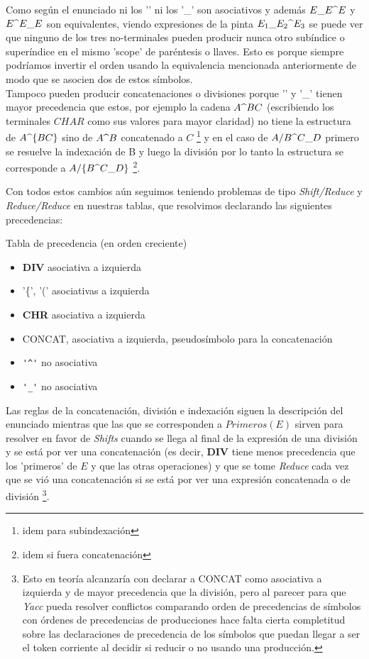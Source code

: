 Como según el enunciado ni los '\super ' ni los '_' son asociativos y además $E\sub  E \super  E$ y $E\super  E \sub  E$ son equivalentes, viendo expresiones de la pinta $E_1 \sub  E_2 \super  E_3$ se puede ver que ninguno de los tres no-terminales pueden producir nunca otro subíndice o superíndice en el mismo 'scope' de paréntesis o llaves. Esto es porque siempre podríamos invertir el orden usando la equivalencia mencionada anteriormente de modo que se asocien dos de estos símbolos. \\
Tampoco pueden producir concatenaciones o divisiones porque '\super' y '_' tienen mayor precedencia que estos, por ejemplo la cadena $A\super BC$ (escribiendo los terminales $CHAR$ como sus valores para mayor claridad) no tiene la estructura de $A\super \{BC\}$ sino de $A\super B$ concatenado a $C$ \footnote{idem para subindexación} y en el caso de $A/B\super C\sub D$ primero se resuelve la indexación de B y luego la división por lo tanto la estructura se corresponde a $A/\{B\super C\sub D\}$ \footnote {idem si fuera concatenación}.

Con todos estos cambios aún seguimos teniendo problemas de tipo \emph{Shift/Reduce} y \emph{Reduce/Reduce} en nuestras tablas, que resolvimos declarando las siguientes precedencias:

Tabla de precedencia (en orden creciente)
\begin{itemize}
	\item \textbf{DIV} asociativa a izquierda

    \item '\{', '(' asociativas a izquierda
    \item \textbf{CHR} asociativa a izquierda
    \item CONCAT, asociativa a izquierda, pseudosímbolo para la concatenación
    \item \verb|'^'| no asociativa
    \item \verb|'_'| no asociativa
\end{itemize}

Las reglas de la concatenación, división e indexación siguen la descripción del enunciado mientras que las que se corresponden a $Primeros(E)$ sirven para resolver en favor de \emph{Shifts} cuando se llega al final de la expresión de una división y se está por ver una concatenación (es decir, \textbf{DIV} tiene menos precedencia que los 'primeros' de $E$ y que las otras operaciones) y que se tome \emph{Reduce} cada vez que se vió una concatenación si se está por ver una expresión concatenada o de división \footnote{Esto en teoría alcanzaría con declarar a CONCAT como asociativa a izquierda y de mayor precedencia que la división, pero al parecer para que \emph{Yacc} pueda resolver conflictos comparando orden de precedencias de símbolos con órdenes de precedencias de producciones hace falta cierta completitud sobre las declaraciones de precedencia de los símbolos que puedan llegar a ser el token corriente al decidir si reducir o no usando una producción.}.

